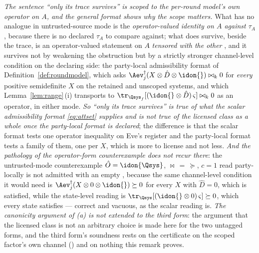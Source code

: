 \begin{remark}
\emph{The sentence ``only its trace survives'' is scoped to the per-round
model's own operator on $A$, and the general format shows why the scope
matters.} What has no analogue in untrusted-source mode is the
\emph{operator-valued identity on $A$ against $\tau_A$}, because there is no
declared $\tau_A$ to compare against; what does survive, beside the trace, is
an operator-valued statement on $A$ \emph{tensored with the other
}, and it survives not by weakening
the obstruction but by a strictly stronger channel-level condition on the
declaring side: the party-local admissibility format of
Definition~\ref{def:roundmodel}, which asks
$\Aev_j^{\dagger}(X\otimes\hat D\otimes\idon{})\bowtie_k0$ for \emph{every}
positive semidefinite $X$ on the retained and unscoped systems, and which
Lemma~\ref{lem:range}\,(i) transports to
$\tr_{\Qsys_f}[(\idon{}\otimes\hat D)\,\varsigma]\bowtie_k0$ as an operator,
in either mode. \emph{So ``only its trace survives'' is true of what the
\emph{scalar} admissibility format \eqref{eq:attset} supplies and is not true
of the licensed class as a whole once the party-local format is declared};
the difference is that the scalar format tests one operator inequality on
Eve's register and the party-local format tests a family of them, one per
$X$, which is more to license and not less. \emph{And the pathology of the
operator-form counterexample does not recur there}: the untrusted-mode
counterexample $\hat O=\idon{\Qsys}$, $\bowtie\,=\,\succeq$, $c=1$ read
party-locally is not admitted with an empty , because the
same channel-level condition it would need is
$\Aev_j^{\dagger}(X\otimes0\otimes\idon{})\succeq0$ for every $X$ with
$\hat D=0$, which is satisfied, while the state-level reading is
$\tr_{\Qsys}[(\idon{}\otimes0)\,\varsigma]\succeq0$, which every state
satisfies --- correct and vacuous, as the scalar reading is. \emph{The
canonicity argument of (a) is not extended to the third form}: the argument
that the licensed class is not an arbitrary choice is made here for the two
untagged forms, and the third form's soundness rests on the certificate on
the scoped factor's own channel
() and on nothing this
remark proves.


\end{remark}
